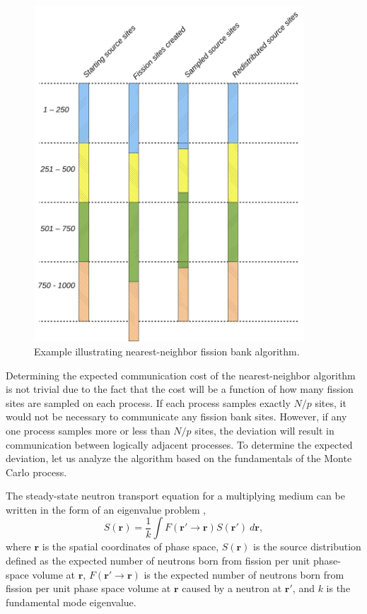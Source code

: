 \begin{figure}[ht!]
  \centering
  \includegraphics[width=0.9\textwidth]{figures/ch3/algorithm_schematic/nearest-neighbor-example.pdf}
  \caption{Example illustrating nearest-neighbor fission bank algorithm.}
  \label{fig:nearest-neighbor-example}
\end{figure}

Determining the expected communication cost of the nearest-neighbor algorithm is
not trivial due to the fact that the cost will be a function of how many fission
sites are sampled on each process. If each process samples exactly $N/p$ sites,
it would not be necessary to communicate any fission bank sites. However, if any
one process samples more or less than $N/p$ sites, the deviation will result in
communication between logically adjacent processes. To determine the expected
deviation, let us analyze the algorithm based on the fundamentals of the Monte
Carlo process.

The steady-state neutron transport equation for a multiplying medium can be
written in the form of an eigenvalue problem \cite{nukleonik-lieberoth-1968},
\begin{equation}
  \label{eq:NTE}
  S(\mathbf{r})= \frac{1}{k} \int F(\mathbf{r}' \rightarrow
  \mathbf{r})S(\mathbf{r}')\: d\mathbf{r},
\end{equation}
where $\mathbf{r}$ is the spatial coordinates of phase space, $S(\mathbf{r})$ is
the source distribution defined as the expected number of neutrons born from
fission per unit phase-space volume at $\mathbf{r}$, $F( \mathbf{r}' \rightarrow
\mathbf{r})$ is the expected number of neutrons born from fission per unit phase
space volume at $\mathbf{r}$ caused by a neutron at $\mathbf{r}'$, and $k$ is
the fundamental mode eigenvalue.


